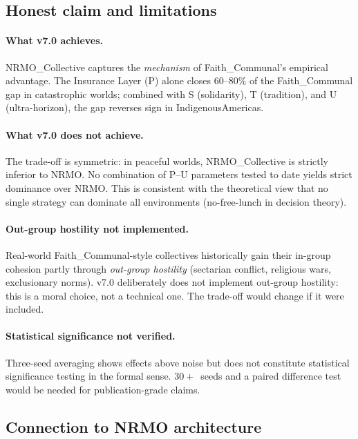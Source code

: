 \subsection{Honest claim and limitations}

\paragraph{What v7.0 achieves.}
NRMO\_Collective captures the \emph{mechanism} of Faith\_Communal's
empirical advantage. The Insurance Layer (P) alone closes
$60$--$80\%$ of the Faith\_Communal gap in catastrophic worlds;
combined with S (solidarity), T (tradition), and U (ultra-horizon),
the gap reverses sign in IndigenousAmericas.

\paragraph{What v7.0 does not achieve.}
The trade-off is symmetric: in peaceful worlds, NRMO\_Collective is
strictly inferior to NRMO. No combination of P--U parameters tested
to date yields strict dominance over NRMO. This is consistent with
the theoretical view that no single strategy can dominate all
environments (no-free-lunch in decision theory).

\paragraph{Out-group hostility not implemented.}
Real-world Faith\_Communal-style collectives historically gain their
in-group cohesion partly through \emph{out-group hostility}
(sectarian conflict, religious wars, exclusionary norms). v7.0
deliberately does not implement out-group hostility: this is a
moral choice, not a technical one. The trade-off would change if it
were included.

\paragraph{Statistical significance not verified.}
Three-seed averaging shows effects above noise but does not
constitute statistical significance testing in the formal sense.
$30+$~seeds and a paired difference test would be needed for
publication-grade claims.

\subsection{Connection to NRMO architecture}

